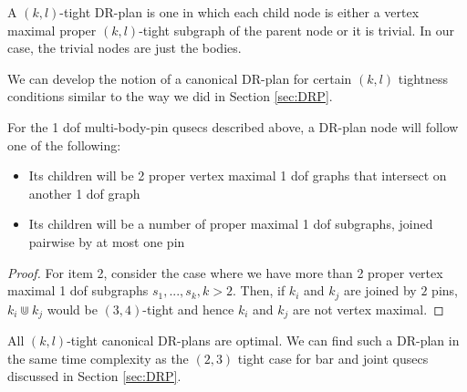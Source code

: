 \begin{definition}
    A $(k,l)$-tight DR-plan is one in which each child node is either a vertex maximal proper $(k,l)$-tight subgraph of the parent node or it is trivial. In our case, the trivial nodes are just the bodies.
\end{definition}

We can develop the notion of a canonical DR-plan for certain $(k,l)$ tightness conditions similar to the way we did in Section \ref{sec:DRP}.

\begin{remark}
\label{rem:1dofcanon}
    For the 1 dof multi-body-pin qusecs described above, a DR-plan node will follow one of the following:

    \begin{itemize}
        \item Its children will be 2 proper vertex maximal 1 dof graphs that intersect on another 1 dof graph
        \item Its children will be a number of proper maximal 1 dof subgraphs, joined pairwise by at most one pin
    \end{itemize}
\end{remark}

\begin{proof}

    For item 2, consider the case where we have more than 2 proper vertex maximal 1 dof subgraphs $s_1, ..., s_k, k > 2$. Then, if $k_i$ and $k_j$ are joined by $2$ pins, $k_i \Cup k_j$ would be $(3,4)$-tight and hence $k_i$ and $k_j$ are not vertex maximal.
\end{proof}

\begin{remark}
    All $(k,l)$-tight canonical DR-plans are optimal. We can find such a DR-plan in the same time complexity as the $(2,3)$ tight case for bar and joint qusecs discussed in Section \ref{sec:DRP}.
\end{remark}

